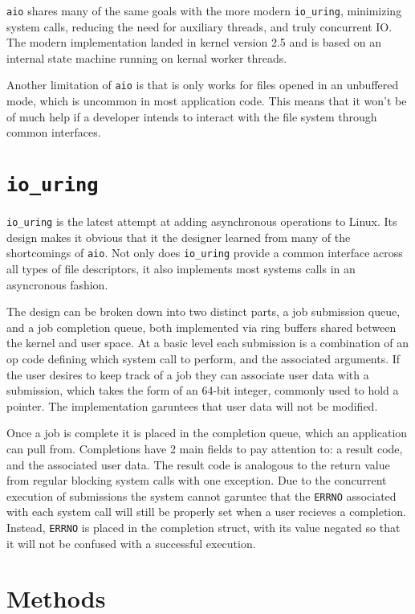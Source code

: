 \documentclass[11pt]{article}
\begin{document}
\texttt{aio} shares many of the same goals with the more modern \texttt{io\_uring}, minimizing system calls, reducing the need for auxiliary threads, and truly concurrent IO. The modern implementation landed in kernel version 2.5 and is based on an internal state machine running on kernal worker threads.

Another limitation of \texttt{aio} is that is only works for files opened in an unbuffered mode, which is uncommon in most application code. This means that it won't be of much help if a developer intends to interact with the file system through common interfaces.

\section{\texttt{io\_uring}}
\label{sec:org0a06ad0}
\texttt{io\_uring} is the latest attempt at adding asynchronous operations to Linux. Its design makes it obvious that it the designer learned from many of the shortcomings of \texttt{aio}. Not only does \texttt{io\_uring} provide a common interface across all types of file descriptors, it also implements most systems calls in an asyncronous fashion.

The design can be broken down into two distinct parts, a job submission queue, and a job completion queue, both implemented via ring buffers shared between the kernel and user space. At a basic level each submission is a combination of an op code defining which system call to perform, and the associated arguments. If the user desires to keep track of a job they can associate user data with a submission, which takes the form of an 64-bit integer, commonly used to hold a pointer. The implementation garuntees that user data will not be modified.

Once a job is complete it is placed in the completion queue, which an application can pull from. Completions have 2 main fields to pay attention to: a result code, and the associated user data. The result code is analogous to the return value from regular blocking system calls with one exception. Due to the concurrent execution of submissions the system cannot garuntee that the \texttt{ERRNO} associated with each system call will still be properly set when a user recieves a completion. Instead, \texttt{ERRNO} is placed in the completion struct, with its value negated so that it will not be confused with a successful execution.

\section{Methods}
\label{sec:orge2b7685}
\end{document}
